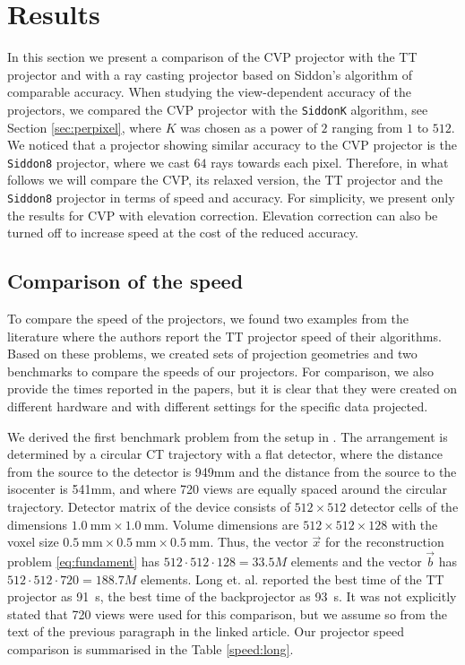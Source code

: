 \section{Results}
In this section we present a comparison of the CVP projector with the TT projector and with a ray casting projector based on Siddon's algorithm of comparable accuracy. When studying the view-dependent accuracy of the projectors, we compared the CVP projector with the \texttt{SiddonK} algorithm, see Section \ref{sec:perpixel}, where $K$ was chosen as a power of $2$ ranging from $1$ to $512$. We noticed that a projector showing similar accuracy to the CVP projector is the \texttt{Siddon8} projector, where we cast $64$ rays towards each pixel. Therefore, in what follows we will compare the CVP, its relaxed version, the TT projector and the \texttt{Siddon8} projector in terms of speed and accuracy. For simplicity, we present only the results for CVP with elevation correction. Elevation correction can also be turned off to increase speed at the cost of the reduced accuracy.

\subsection{Comparison of the speed}
To compare the speed of the projectors, we found two examples from the literature where the authors report the TT projector speed of their algorithms. Based on these problems, we created sets of projection geometries and two benchmarks to compare the speeds of our projectors. For comparison, we also provide the times reported in the papers, but it is clear that they were created on different hardware and with different settings for the specific data projected.

We derived the first benchmark problem from the setup in \cite{Long2010}. The arrangement is determined by a circular CT trajectory with a flat detector, where the distance from the source to the detector is 949mm and the distance from the source to the isocenter is 541mm, and where 720 views are equally spaced around the circular trajectory. Detector matrix of the device consists of $512 \times 512$ detector cells of the dimensions $\SI{1.0}{\milli \meter} \times \SI{1.0}{\milli \meter}$. Volume dimensions are $512 \times 512 \times 128$ with the voxel size $\SI{0.5}{\milli\meter} \times \SI{0.5}{\milli \meter} \times \SI{0.5}{\milli \meter}$. Thus, the vector $\vec{x}$ for the reconstruction problem \eqref{eq:fundament} has $512 \cdot 512 \cdot 128 = 33.5M$ elements and the vector $\vec{b}$ has $512 \cdot 512 \cdot 720 = 188.7M$ elements. Long et. al. \cite{Long2010} reported the best time of the TT projector as \SI{91}{\second}, the best time of the backprojector as \SI{93}{\second}. It was not explicitly stated that 720 views were used for this comparison, but we assume so from the text of the previous paragraph in the linked article. Our projector speed comparison is summarised in the Table \ref{speed:long}.

